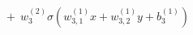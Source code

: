 \documentclass[preview]{standalone}
\begin{document}
\begin{align*}
+ \ \ w_3^{(2)} \sigma(w_{3,1}^{(1)}x + w_{3,2}^{(1)}y +b_3^{(1)})
\end{align*}
\end{document}
